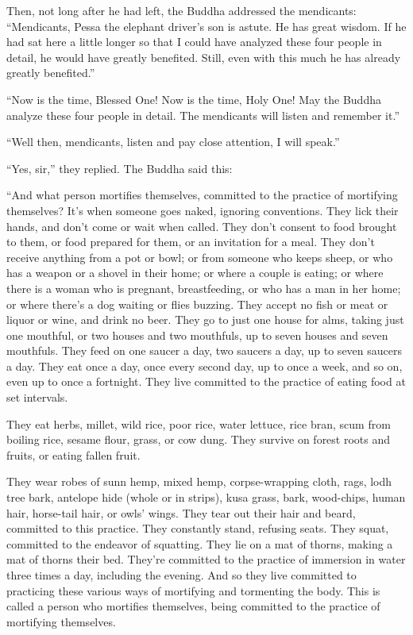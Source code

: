 \documentclass[12pt,openany]{book}%
\begin{document}
Then, not long after he had left, the Buddha addressed the mendicants: “Mendicants, Pessa the elephant driver’s son is astute. He has great wisdom. If he had sat here a little longer so that I could have analyzed these four people in detail, he would have greatly benefited. Still, even with this much he has already greatly benefited.” 

“Now is the time, Blessed One! Now is the time, Holy One! May the Buddha analyze these four people in detail. The mendicants will listen and remember it.” 

“Well then, mendicants, listen and pay close attention, I will speak.” 

“Yes, sir,” they replied. The Buddha said this: 

“And what person mortifies themselves, committed to the practice of mortifying themselves? It’s when someone goes naked, ignoring conventions. They lick their hands, and don’t come or wait when called. They don’t consent to food brought to them, or food prepared for them, or an invitation for a meal. They don’t receive anything from a pot or bowl; or from someone who keeps sheep, or who has a weapon or a shovel in their home; or where a couple is eating; or where there is a woman who is pregnant, breastfeeding, or who has a man in her home; or where there’s a dog waiting or flies buzzing. They accept no fish or meat or liquor or wine, and drink no beer. They go to just one house for alms, taking just one mouthful, or two houses and two mouthfuls, up to seven houses and seven mouthfuls. They feed on one saucer a day, two saucers a day, up to seven saucers a day. They eat once a day, once every second day, up to once a week, and so on, even up to once a fortnight. They live committed to the practice of eating food at set intervals. 

They eat herbs, millet, wild rice, poor rice, water lettuce, rice bran, scum from boiling rice, sesame flour, grass, or cow dung. They survive on forest roots and fruits, or eating fallen fruit. 

They wear robes of sunn hemp, mixed hemp, corpse-wrapping cloth, rags, lodh tree bark, antelope hide (whole or in strips), kusa grass, bark, wood-chips, human hair, horse-tail hair, or owls’ wings. They tear out their hair and beard, committed to this practice. They constantly stand, refusing seats. They squat, committed to the endeavor of squatting. They lie on a mat of thorns, making a mat of thorns their bed. They’re committed to the practice of immersion in water three times a day, including the evening. And so they live committed to practicing these various ways of mortifying and tormenting the body. This is called a person who mortifies themselves, being committed to the practice of mortifying themselves. 
\end{document}
